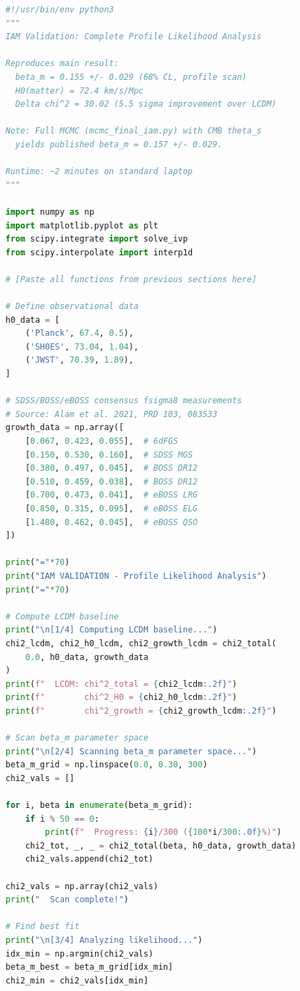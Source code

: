 \documentclass[11pt]{article}
\begin{document}
\begin{lstlisting}[language=Python]
#!/usr/bin/env python3
"""
IAM Validation: Complete Profile Likelihood Analysis

Reproduces main result:
  beta_m = 0.155 +/- 0.029 (68% CL, profile scan)
  H0(matter) = 72.4 km/s/Mpc
  Delta chi^2 = 30.02 (5.5 sigma improvement over LCDM)
  
Note: Full MCMC (mcmc_final_iam.py) with CMB theta_s
  yields published beta_m = 0.157 +/- 0.029.
  
Runtime: ~2 minutes on standard laptop
"""

import numpy as np
import matplotlib.pyplot as plt
from scipy.integrate import solve_ivp
from scipy.interpolate import interp1d

# [Paste all functions from previous sections here]

# Define observational data
h0_data = [
    ('Planck', 67.4, 0.5),
    ('SH0ES', 73.04, 1.04),
    ('JWST', 70.39, 1.89),
]

# SDSS/BOSS/eBOSS consensus fsigma8 measurements
# Source: Alam et al. 2021, PRD 103, 083533
growth_data = np.array([
    [0.067, 0.423, 0.055],  # 6dFGS
    [0.150, 0.530, 0.160],  # SDSS MGS
    [0.380, 0.497, 0.045],  # BOSS DR12
    [0.510, 0.459, 0.038],  # BOSS DR12
    [0.700, 0.473, 0.041],  # eBOSS LRG
    [0.850, 0.315, 0.095],  # eBOSS ELG
    [1.480, 0.462, 0.045],  # eBOSS QSO
])

print("="*70)
print("IAM VALIDATION - Profile Likelihood Analysis")
print("="*70)

# Compute LCDM baseline
print("\n[1/4] Computing LCDM baseline...")
chi2_lcdm, chi2_h0_lcdm, chi2_growth_lcdm = chi2_total(
    0.0, h0_data, growth_data
)
print(f"  LCDM: chi^2_total = {chi2_lcdm:.2f}")
print(f"        chi^2_H0 = {chi2_h0_lcdm:.2f}")
print(f"        chi^2_growth = {chi2_growth_lcdm:.2f}")

# Scan beta_m parameter space
print("\n[2/4] Scanning beta_m parameter space...")
beta_m_grid = np.linspace(0.0, 0.30, 300)
chi2_vals = []

for i, beta in enumerate(beta_m_grid):
    if i % 50 == 0:
        print(f"  Progress: {i}/300 ({100*i/300:.0f}%)")
    chi2_tot, _, _ = chi2_total(beta, h0_data, growth_data)
    chi2_vals.append(chi2_tot)

chi2_vals = np.array(chi2_vals)
print("  Scan complete!")

# Find best fit
print("\n[3/4] Analyzing likelihood...")
idx_min = np.argmin(chi2_vals)
beta_m_best = beta_m_grid[idx_min]
chi2_min = chi2_vals[idx_min]


\end{lstlisting}
\end{document}
